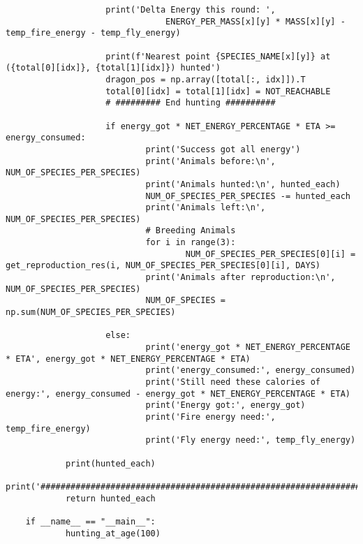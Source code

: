 \begin{lstlisting}
					print('Delta Energy this round: ',
								ENERGY_PER_MASS[x][y] * MASS[x][y] - temp_fire_energy - temp_fly_energy)

					print(f'Nearest point {SPECIES_NAME[x][y]} at ({total[0][idx]}, {total[1][idx]}) hunted')
					dragon_pos = np.array([total[:, idx]]).T
					total[0][idx] = total[1][idx] = NOT_REACHABLE
					# ######### End hunting ##########

					if energy_got * NET_ENERGY_PERCENTAGE * ETA >= energy_consumed:
							print('Success got all energy')
							print('Animals before:\n', NUM_OF_SPECIES_PER_SPECIES)
							print('Animals hunted:\n', hunted_each)
							NUM_OF_SPECIES_PER_SPECIES -= hunted_each
							print('Animals left:\n', NUM_OF_SPECIES_PER_SPECIES)
							# Breeding Animals
							for i in range(3):
									NUM_OF_SPECIES_PER_SPECIES[0][i] = get_reproduction_res(i, NUM_OF_SPECIES_PER_SPECIES[0][i], DAYS)
							print('Animals after reproduction:\n', NUM_OF_SPECIES_PER_SPECIES)
							NUM_OF_SPECIES = np.sum(NUM_OF_SPECIES_PER_SPECIES)

					else:
							print('energy_got * NET_ENERGY_PERCENTAGE * ETA', energy_got * NET_ENERGY_PERCENTAGE * ETA)
							print('energy_consumed:', energy_consumed)
							print('Still need these calories of energy:', energy_consumed - energy_got * NET_ENERGY_PERCENTAGE * ETA)
							print('Energy got:', energy_got)
							print('Fire energy need:', temp_fire_energy)
							print('Fly energy need:', temp_fly_energy)

			print(hunted_each)
			print('################################################################')
			return hunted_each

	if __name__ == "__main__":
			hunting_at_age(100)
\end{lstlisting}

% 
